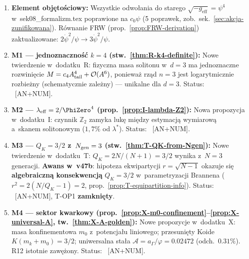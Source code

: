 \begin{remark}\label{rem:status-v47}
\begin{enumerate}[nosep]
  \item \textbf{Element obj\k{e}to\'sciowy:}
    Wszystkie odwo\l{}ania do starego
    $\sqrt{-g_{\mathrm{eff}}} = \psi^4$ w~sek08\_formalizm.tex
    poprawione na $c_0\psi$
    (5 poprawek, zob.\ sek.~\ref{sec:akcja-zunifikowana}).
    R\'ownanie FRW (prop.~\ref{prop:FRW-derivation})
    zaktualizowane: $2\dot\psi^2/\psi \to 3\dot\psi^2/\psi$.

  \item \textbf{M1 --- jednoznaczno\'s\'c $k = 4$ (stw.~\ref{thm:R-k4-definite}):}
    Nowe twierdzenie w~dodatku~R:
    fizyczna masa solitonu w~$d = 3$ ma jednoznaczne
    rozwini\k{e}cie $M = c_4 A_{\rm tail}^4 + \mathcal{O}(A^6)$,
    poniewa\.z rz\k{a}d $n = 3$ jest logarytmicznie rozbie\.zny
    (schematycznie zale\.zny) --- unikalne dla $d = 3$.
    Status: ~[AN+NUM].

  \item \textbf{M2 --- $\lambda_{\mathrm{eff}} = 2/\PhiZero^4$
    (prop.~\ref{prop:I-lambda-Z2}):}
    Nowa propozycja w~dodatku~I: czynnik $\mathbb{Z}_2$
    zamyka luk\k{e} mi\k{e}dzy estymacj\k{a} wymiarow\k{a}
    a~skanem solitonowym ($1{,}7\%$ od $\lambda^*$).
    Status: ~[AN+NUM].

  \item \textbf{M3 --- $Q_K = 3/2$ z~$N_{\rm gen} = 3$
    (stw.~\ref{thm:T-QK-from-Ngen}):}
    Nowe twierdzenie w~dodatku~T:
    $Q_K = 2N/(N+1) = 3/2$ wynika z~$N = 3$ generacji.
    \textbf{Awans w~v47b}: hipoteza ekwipartycji
    $r = \sqrt{N{-}1}$ okazuje si\k{e} \textbf{algebraiczn\k{a}
    konsekwencj\k{a}} $Q_K = 3/2$ w~parametryzacji Brannena
    ($r^2 = 2(N/Q_K - 1) = 2$,
    prop.~\ref{prop:T-equipartition-info}).
    Status: ~[AN+NUM],
    T-OP1 \textbf{zamkni\k{e}ty}.

  \item \textbf{M4 --- sektor kwarkowy
    (prop.~\ref{prop:X-m0-confinement}--\ref{prop:X-universal-A},
    tw.~\ref{thm:X-A-golden}):}
    Nowe propozycje w~dodatku~X:
    masa konfinementowa $m_0$ z~potencja\l{}u liniowego;
    przesuni\k{e}ty Koide $K(m_k + m_0) = 3/2$;
    uniwersalna sta\l{}a $\mathcal{A} = a_\Gamma/\varphi = 0.02472$
    (odch.\ $0.31\%$). R12 istotnie zaw\k{e}\.zony.
    Status: ~[AN+NUM].


\end{enumerate}
\end{remark}
